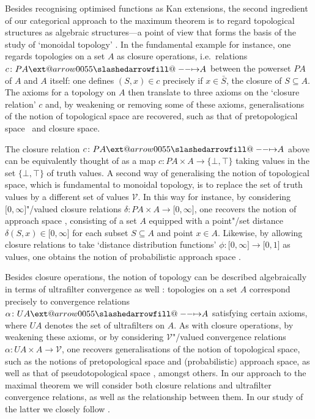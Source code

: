\documentclass[preprint, a4paper]{elsarticle}
\makeatletter
\def\slashedarrowfill@#1#2#3#4#5{%
  $\m@th\thickmuskip0mu\medmuskip\thickmuskip\thinmuskip\thickmuskip
   \relax#5#1\mkern-7mu%
   \cleaders\hbox{$#5\mkern-2mu#2\mkern-2mu$}\hfill
   \mathclap{#3}\mathclap{#2}%
   \cleaders\hbox{$#5\mkern-2mu#2\mkern-2mu$}\hfill
   \mkern-7mu#4$%
}
\def\rightslashedarrowfill@{%
  \slashedarrowfill@\relbar\relbar\mapstochar\rightarrow}
\newcommand\xslashedrightarrow[2][]{%
  \ext@arrow 0055{\rightslashedarrowfill@}{#1}{#2}}
\def\slashedrightarrow{\xslashedrightarrow{}}
\theoremstyle{definition}
\theoremstyle{remark}
\providecommand{\brcs}[1]{\lbrace #1 \rbrace}
\providecommand{\brks}[1]{\lbrack #1 \rbrack}
\providecommand{\set}[1]{\brcs{#1}}
\providecommand{\map}[3]{#1\colon#2\to#3}
\providecommand{\hmap}[3]{#1\colon#2\slashedrightarrow#3}
\providecommand{\catvar}[1]{\mathcal{#1}}
\providecommand{\2}{\mathsf 2}
\providecommand{\V}{\catvar V}
\makeatother
\begin{document}
	Besides recognising optimised functions as Kan extensions, the second ingredient of our categorical approach to the maximum theorem is to regard topological structures as algebraic structures---a point of view that forms the basis of the study of `monoidal topology' \cite{Hofmann-Seal-Tholen14}. In the fundamental example for instance, one regards topologies on a set $A$ as closure operations, i.e.\ relations $\hmap c{PA}A$ between the powerset $PA$ of $A$ and $A$ itself: one defines $(S, x) \in c$ precisely if $x \in \bar S$, the closure of $S \subseteq A$. The axioms for a topology on $A$ then translate to three axioms on the `closure relation' $c$ and, by weakening or removing some of these axioms, generalisations of the notion of topological space are recovered, such as that of pretopological space~\cite{Choquet48} and closure space.
	
	The closure relation $\hmap c{PA}A$ above can be equivalently thought of as a map $\map c{PA \times A}{\set{\bot, \top}}$ taking values in the set $\set{\bot, \top}$ of truth values. A second way of generalising the notion of topological space, which is fundamental to monoidal topology, is to replace the set of truth values by a different set of values $\V$. In this way for instance, by considering $\brks{0, \infty}$"/valued closure relations $\map\delta{PA \times A}{\brks{0, \infty}}$, one recovers the notion of approach space \cite{Lowen97}, consisting of a set $A$ equipped with a point"/set distance $\delta(S, x) \in \brks{0, \infty}$ for each subset $S \subseteq A$ and point \mbox{$x \in A$}. Likewise, by allowing closure relations to take `distance distribution functions' \mbox{$\map\phi{\brks{0, \infty}}{\brks{0, 1}}$} as values, one obtains the notion of probabilistic approach space \cite{Lai-Tholen17b}.
	
	Besides closure operations, the notion of topology can be described algebraically in terms of ultrafilter convergence as well \cite{Barr70}: topologies on a set $A$ correspond precisely to convergence relations $\hmap\alpha{UA}A$ satisfying certain axioms, where $UA$ denotes the set of ultrafilters on $A$. As with closure operations, by weakening these axioms, or by considering $\V$"/valued convergence relations $\map\alpha{UA \times A}\V$, one recovers generalisations of the notion of topological space, such as the notions of pretopological space and (probabilistic) approach space, as well as that of pseudotopological space \cite{Choquet48}, amongst others. In our approach to the maximal theorem we will consider both closure relations and ultrafilter convergence relations, as well as the relationship between them. In our study of the latter we closely follow \cite{Lai-Tholen17a}.
	
\end{document}
